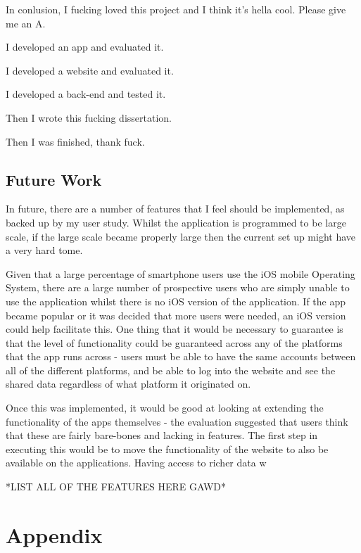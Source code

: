 \documentclass{l4proj}
\begin{document}
In conlusion, I fucking loved this project and I think it's hella cool. Please give me an A.

I developed an app and evaluated it.

I developed a website and evaluated it.

I developed a back-end and tested it.

Then I wrote this fucking dissertation.

Then I was finished, thank fuck.

\section{Future Work}

In future, there are a number of features that I feel should be implemented, as backed up by my user study. Whilst the application is programmed to be large scale, if the large scale became properly large then the current set up might have a very hard tome.

Given that a large percentage of smartphone users use the iOS mobile Operating System, there are a large number of prospective users who are simply unable to use the application whilst there is no iOS version of the application. If the app became popular or it was decided that more users were needed, an iOS version could help facilitate this. One thing that it would be necessary to guarantee is that the level of functionality could be guaranteed across any of the platforms that the app runs across - users must be able to have the same accounts between all of the different platforms, and be able to log into the website and see the shared data regardless of what platform it originated on.

Once this was implemented, it would be good at looking at extending the functionality of the apps themselves - the evaluation suggested that users think that these are fairly bare-bones and lacking in features. The first step in executing this would be to move the functionality of the website to also be available on the applications. Having access to richer data w

*LIST ALL OF THE FEATURES HERE GAWD*


\chapter{Appendix}
\end{document}
